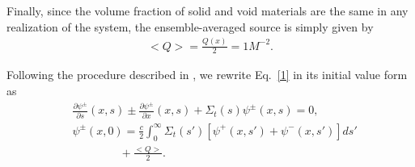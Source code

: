 \documentclass{anstrans}
\newcommand{\bl}{\big<}
\newcommand{\bg}{\big>}
\begin{document}
Finally, since the volume fraction of solid and void materials are the same in any realization of the system, the ensemble-averaged source is simply given by
\begin{align}
\bl Q\bg = \frac{Q(x)}{2} = 1M^{-2}.\nonumber
\end{align}



Following the procedure described in \cite{vas15}, we rewrite Eq.\ \eqref{1} in its initial value form as
\begin{subequations}\label{9}
\begin{align}
&\frac{\partial\psi^{\pm}}{\partial s}(x,s) \pm \frac{\partial \psi^{\pm}}{\partial x}(x,s) + \Sigma_t(s)\psi^{\pm}(x,s)  = 0, \label{9a}\\
& \psi^{\pm}(x,0)= \frac{c}{2} \int_0^\infty \Sigma_t(s')[\psi^{+}(x,s')+\psi^{-}(x,s')]ds' \label{9b}\\
& \hspace{50pt}+ \frac{\bl Q\bg}{2}. \nonumber
\end{align}
\end{subequations}
\end{document}
